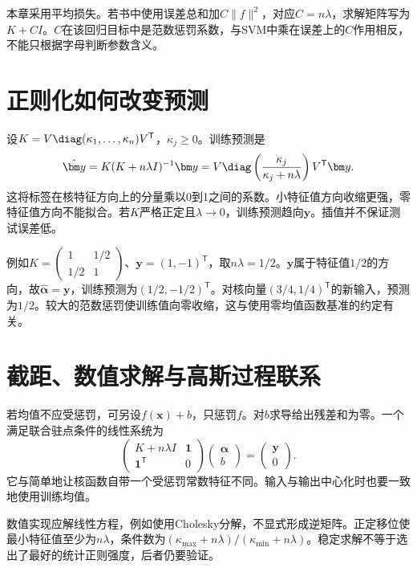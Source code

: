 本章采用平均损失。若书中使用误差总和加$C\|f\|^2$，对应$C=n\lambda$，求解矩阵写为$K+CI$。$C$在该回归目标中是范数惩罚系数，与SVM中乘在误差上的$C$作用相反，不能只根据字母判断参数含义。

\section{正则化如何改变预测}
设$K=V\diag(\kappa_1,\ldots,\kappa_n)V^{\mathsf T}$，$\kappa_j\ge0$。训练预测是
\begin{equation}
 \hat{\bm y}=K(K+n\lambda I)^{-1}\bm y
 =V\diag\left(\frac{\kappa_j}{\kappa_j+n\lambda}\right)V^{\mathsf T}\bm y.
 \label{eq:krr-spectral-shrinkage}
\end{equation}
这将标签在核特征方向上的分量乘以0到1之间的系数。小特征值方向收缩更强，零特征值方向不能拟合。若$K$严格正定且$\lambda\to0$，训练预测趋向$\bm y$。插值并不保证测试误差低。

例如$K=\left(\begin{smallmatrix}1&1/2\\1/2&1\end{smallmatrix}\right)$、$\bm y=(1,-1)^{\mathsf T}$，取$n\lambda=1/2$。$\bm y$属于特征值$1/2$的方向，故$\hat{\bm\alpha}=\bm y$，训练预测为$(1/2,-1/2)^{\mathsf T}$。对核向量$(3/4,1/4)^{\mathsf T}$的新输入，预测为$1/2$。较大的范数惩罚使训练值向零收缩，这与使用零均值函数基准的约定有关。

\section{截距、数值求解与高斯过程联系}
若均值不应受惩罚，可另设$f(\bm x)+b$，只惩罚$f$。对$b$求导给出残差和为零。一个满足联合驻点条件的线性系统为
\begin{equation}
 \begin{pmatrix}K+n\lambda I&\bm1\\\bm1^{\mathsf T}&0\end{pmatrix}
 \begin{pmatrix}\bm\alpha\\b\end{pmatrix}
 =\begin{pmatrix}\bm y\\0\end{pmatrix}.
\end{equation}
它与简单地让核函数自带一个受惩罚常数特征不同。输入与输出中心化时也要一致地使用训练均值。

数值实现应解线性方程，例如使用Cholesky分解，不显式形成逆矩阵。正定移位使最小特征值至少为$n\lambda$，条件数为$(\kappa_{\max}+n\lambda)/(\kappa_{\min}+n\lambda)$。稳定求解不等于选出了最好的统计正则强度，后者仍要验证。


